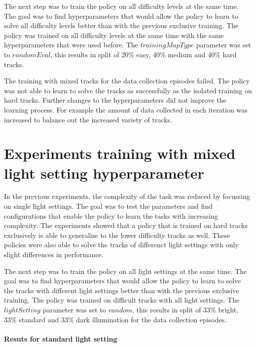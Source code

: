 The next step was to train the policy on all difficulty levels at the same time. The goal was to find hyperparameters that would allow the policy to learn to solve all difficulty levels better than with the previous exclusive training. The policy was trained on all difficulty levels at the same time with the same hyperparameters that were used before. The $trainingMapType$ parameter was set to $randomEval$, this results in split of 20\% easy, 40\% medium and 40\% hard tracks.

The training with mixed tracks for the data collection episodes failed. The policy was not able to learn to solve the tracks as successfully as the isolated training on hard tracks. Further changes to the hyperparameters did not improve the learning process. For example the amount of data collected in each iteration was increased to balance out the increased variety of tracks.


\section{Experiments training with mixed light setting hyperparameter}
\label{cha:experiment_mixed_light}

In the previous experiments, the complexity of the task was reduced by focussing on single light settings. The goal was to test the parameters and find configurations that enable the policy to learn the tasks with increasing complexity. The experiments showed that a policy that is trained on hard tracks exclusively is able to generalize to the lower difficulty tracks as well. These policies were also able to solve the tracks of differenct light settings with only slight differences in performance.


The next step was to train the policy on all light settings at the same time. The goal was to find hyperparameters that would allow the policy to learn to solve the tracks with different light settings better than with the previous exclusive training. The policy was trained on difficult tracks with all light settings. The $lightSetting$ parameter was set to $random$, this results in split of 33\% bright, 33\% standard and 33\% dark illumination for the data collection episodes.

\paragraph{Resuts for standard light setting}

